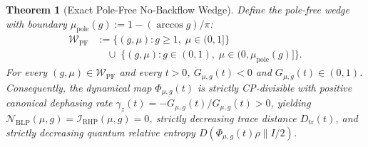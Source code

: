 \documentclass[twocolumn,10pt,amsmath,amssymb,floatfix]{revtex4-2}
\theoremstyle{plain}
\newtheorem{theorem}{Theorem}
\theoremstyle{definition}
\newcommand{\NBLP}{\mathcal{N}_{\mathrm{BLP}}}
\newcommand{\IRHP}{\mathcal{I}_{\mathrm{RHP}}}
\newcommand{\mupole}{\mu_{\mathrm{pole}}}
\begin{document}
\begin{theorem}[Exact Pole-Free No-Backflow Wedge]
\label{thm:pole_free_wedge}
Define the pole-free wedge with boundary $\mupole(g) := 1 - (\arccos g)/\pi$:
\begin{align*}
\mathcal{W}_{\mathrm{PF}} &:= \big\{(g,\mu) : g \ge 1,\; \mu \in (0,1]\big\} \\
&\quad \cup\; \big\{(g,\mu) : g \in (0,1),\; \mu \in \big(0, \mupole(g)\big]\big\}.
\end{align*}
For every $(g,\mu) \in \mathcal{W}_{\mathrm{PF}}$ and every $t > 0$, $\dot{G}_{\mu,g}(t) < 0$ and $G_{\mu,g}(t) \in (0, 1)$. Consequently, the dynamical map $\Phi_{\mu,g}(t)$ is strictly CP-divisible with positive canonical dephasing rate $\gamma_z(t) = -\dot{G}_{\mu,g}(t)/G_{\mu,g}(t) > 0$, yielding $\NBLP(\mu,g) = \IRHP(\mu,g) = 0$, strictly decreasing trace distance $D_{\mathrm{tr}}(t)$, and strictly decreasing quantum relative entropy $D(\Phi_{\mu,g}(t)\rho \parallel I/2)$.
\end{theorem}
\end{document}
